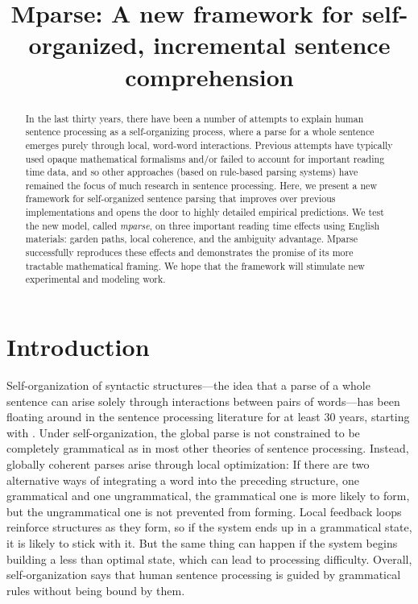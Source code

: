 \documentclass[a4paper, 12pt]{article}
\title{Mparse: A new framework for self-organized, incremental sentence
    comprehension}
\begin{document}
\maketitle

\begin{abstract}
In the last thirty years, there have been a number of attempts to explain human
sentence processing as a self-organizing process, where a parse for a whole
sentence emerges purely through local, word-word interactions. Previous
attempts have typically used opaque mathematical formalisms
and/or failed to account for important reading time data, and so other
approaches (based on rule-based parsing systems) have remained the focus of
much research in sentence processing. Here, we present a new framework for
self-organized sentence parsing that improves over previous implementations and
opens the door to highly detailed empirical predictions. We test the new model,
called \emph{mparse}, on three important reading time effects using English
materials: garden paths, local coherence, and the ambiguity advantage.
Mparse successfully reproduces these effects and demonstrates the promise of
its more tractable mathematical framing. We hope that the framework will
stimulate new experimental and modeling work.
\end{abstract}




\section{Introduction}
Self-organization of syntactic structures---the idea that a parse of a whole
sentence can arise solely through interactions between pairs of words---has
been floating around in the sentence processing literature for at least 30
years, starting with \citet{kempen1989incremental}. Under self-organization,
the global parse is not constrained to be completely grammatical as in most
other theories of sentence processing. Instead, globally coherent parses arise
through local optimization: If there are two alternative ways of integrating a
word into the preceding structure, one grammatical and one ungrammatical, the
grammatical one is more likely to form, but the ungrammatical one is not
prevented from forming. Local feedback loops reinforce structures as they form,
so if the system ends up in a grammatical state, it is likely to stick with it.
But the same thing can happen if the system begins building a less than optimal
state, which can lead to processing difficulty.  Overall, self-organization
says that human sentence processing is guided by grammatical rules without
being bound by them.
\end{document}
